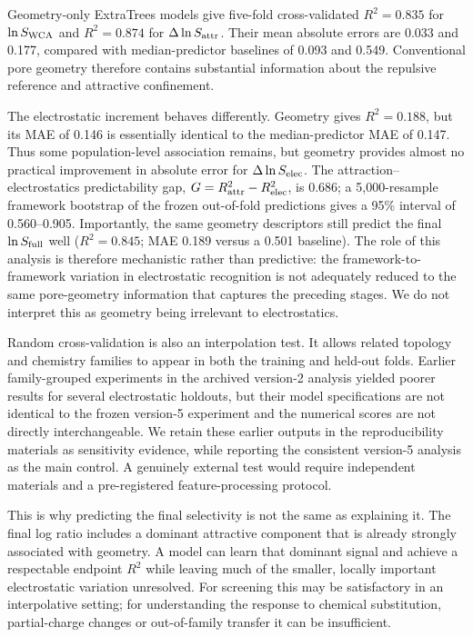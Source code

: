 \documentclass[journal=jctcce,manuscript=article]{achemso}
\begin{document}
Geometry-only ExtraTrees models give five-fold cross-validated $R^2=0.835$ for $\ln S_{\rm WCA}$ and $R^2=0.874$ for $\Delta\ln S_{\rm attr}$. Their mean absolute errors are 0.033 and 0.177, compared with median-predictor baselines of 0.093 and 0.549. Conventional pore geometry therefore contains substantial information about the repulsive reference and attractive confinement.

The electrostatic increment behaves differently. Geometry gives $R^2=0.188$, but its MAE of 0.146 is essentially identical to the median-predictor MAE of 0.147. Thus some population-level association remains, but geometry provides almost no practical improvement in absolute error for $\Delta\ln S_{\rm elec}$. The attraction--electrostatics predictability gap, $G=R^2_{\rm attr}-R^2_{\rm elec}$, is 0.686; a 5,000-resample framework bootstrap of the frozen out-of-fold predictions gives a 95\% interval of 0.560--0.905. Importantly, the same geometry descriptors still predict the final $\ln S_{\rm full}$ well ($R^2=0.845$; MAE 0.189 versus a 0.501 baseline). The role of this analysis is therefore mechanistic rather than predictive: the framework-to-framework variation in electrostatic recognition is not adequately reduced to the same pore-geometry information that captures the preceding stages. We do not interpret this as geometry being irrelevant to electrostatics.

Random cross-validation is also an interpolation test. It allows related topology and chemistry families to appear in both the training and held-out folds. Earlier family-grouped experiments in the archived version-2 analysis yielded poorer results for several electrostatic holdouts, but their model specifications are not identical to the frozen version-5 experiment and the numerical scores are not directly interchangeable. We retain these earlier outputs in the reproducibility materials as sensitivity evidence, while reporting the consistent version-5 analysis as the main control. A genuinely external test would require independent materials and a pre-registered feature-processing protocol.

This is why predicting the final selectivity is not the same as explaining it. The final log ratio includes a dominant attractive component that is already strongly associated with geometry. A model can learn that dominant signal and achieve a respectable endpoint $R^2$ while leaving much of the smaller, locally important electrostatic variation unresolved. For screening this may be satisfactory in an interpolative setting; for understanding the response to chemical substitution, partial-charge changes or out-of-family transfer it can be insufficient.
\end{document}
